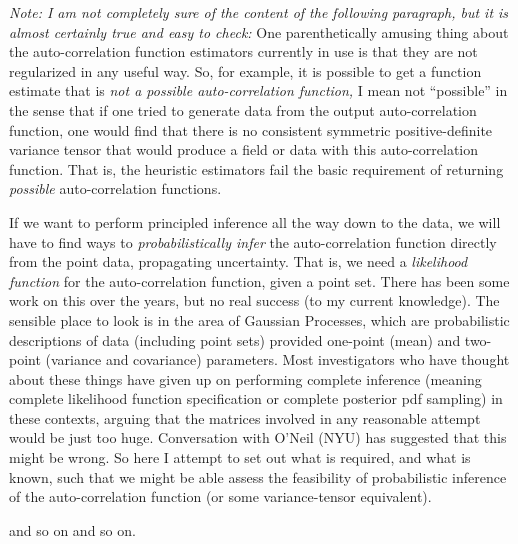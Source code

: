 \documentclass[12pt]{article}
\begin{document}
\textsl{Note: I am not completely sure of the content of the following paragraph,
  but it is almost certainly true and easy to check:}
One parenthetically amusing thing about the auto-correlation function estimators currently in use
  is that they are not regularized in any useful way.
So, for example, it is possible to get a function estimate that is
  \emph{not a possible auto-correlation function,}
I mean not ``possible'' in the sense that if one tried to generate data from the output
  auto-correlation function,
  one would find that there is no consistent symmetric positive-definite variance tensor
  that would produce a field or data with this auto-correlation function.
That is, the heuristic estimators fail the basic requirement of returning
  \emph{possible} auto-correlation functions.

If we want to perform principled inference all the way down to the data,
  we will have to find ways to \emph{probabilistically infer} the auto-correlation function
  directly from the point data,
  propagating uncertainty.
That is, we need a \emph{likelihood function} for the auto-correlation function,
  given a point set.
There has been some work on this over the years,
  but no real success (to my current knowledge).
The sensible place to look is in the area of Gaussian Processes,
  which are probabilistic descriptions of data (including point sets)
  provided one-point (mean) and two-point (variance and covariance) parameters.
Most investigators who have thought about these things have given up on
  performing complete inference (meaning complete likelihood function specification
  or complete posterior pdf sampling) in these contexts,
  arguing that the matrices involved in any reasonable attempt would be just too huge.
Conversation with O'Neil (NYU) has suggested that this might be wrong.
So here I attempt to set out what is required,
  and what is known,
  such that we might be able assess the feasibility of probabilistic inference of the auto-correlation function
  (or some variance-tensor equivalent).

and so on and so on.
\end{document}
